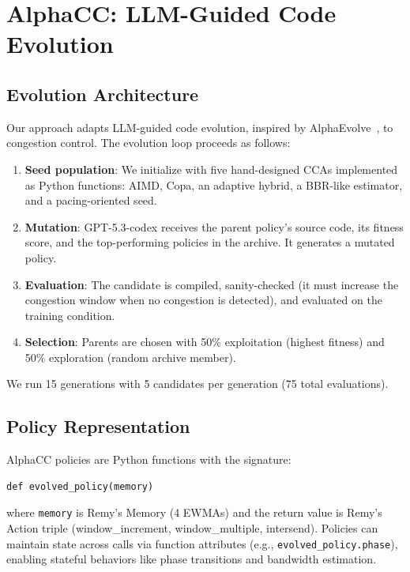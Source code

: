 \section{AlphaCC: LLM-Guided Code Evolution}
\label{sec:llm}

\subsection{Evolution Architecture}

Our approach adapts LLM-guided code evolution, inspired by
AlphaEvolve~\cite{alphaevolve2025}, to congestion control. The evolution loop
proceeds as follows:

\begin{enumerate}
\item \textbf{Seed population}: We initialize with five hand-designed CCAs
  implemented as Python functions: AIMD, Copa, an adaptive hybrid, a
  BBR-like estimator, and a pacing-oriented seed.
\item \textbf{Mutation}: GPT-5.3-codex receives the parent policy's source
  code, its fitness score, and the top-performing policies in the archive.
  It generates a mutated policy.
\item \textbf{Evaluation}: The candidate is compiled, sanity-checked (it must
  increase the congestion window when no congestion is detected), and evaluated
  on the training condition.
\item \textbf{Selection}: Parents are chosen with 50\% exploitation (highest
  fitness) and 50\% exploration (random archive member).
\end{enumerate}

We run 15 generations with 5 candidates per generation (75 total evaluations).

\subsection{Policy Representation}

AlphaCC policies are Python functions with the signature:
\begin{verbatim}
def evolved_policy(memory)
\end{verbatim}
where \texttt{memory} is Remy's Memory (4 EWMAs) and the return value is Remy's
Action triple (window\_increment, window\_multiple, intersend). Policies can
maintain state across calls via function attributes (e.g.,
\texttt{evolved\_policy.phase}), enabling stateful behaviors like phase
transitions and bandwidth estimation.

